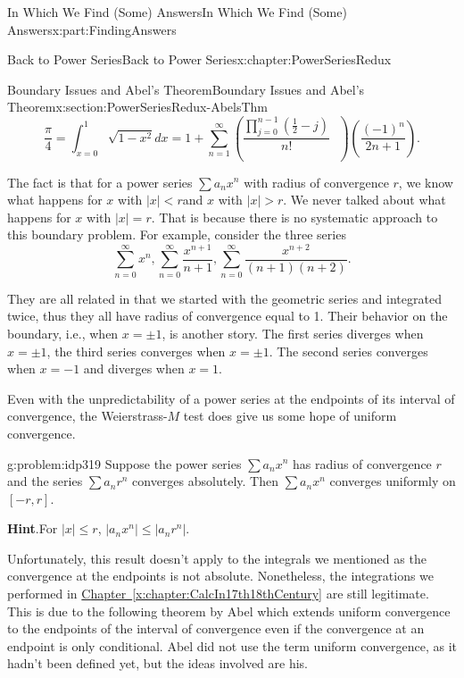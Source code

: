 \documentclass[oneside,10pt,]{book}
\newcommand{\blocktitlefont}{\relax}
\newcommand{\xreffont}{\relax}
\numberwithin{equation}{section}
\newcommand{\lt}{<}
\begin{document}
\begin{partptx}{In Which We Find (Some) Answers}{}{In Which We Find (Some) Answers}{}{}{x:part:FindingAnswers}
\begin{chapterptx}{Back to Power Series}{}{Back to Power Series}{}{}{x:chapter:PowerSeriesRedux}
\begin{sectionptx}{Boundary Issues and Abel's Theorem}{}{Boundary Issues and Abel's Theorem}{}{}{x:section:PowerSeriesRedux-AbelsThm}
\begin{equation*}
\frac{\pi}{4}=\int_{x=0}^1\sqrt{1-x^2}dx=1+\sum_{n=1}^\infty\left(\frac{\prod_{j=0}^{n-1}\left(\frac{1}{2}-j\right)}{n!}\text{ } \right)\left(\frac{\left(-1\right)^n}{2n+1}\right)\text{.}
\end{equation*}
%
\par
The fact is that for a power series \(\sum a_nx^n\) with radius of convergence \(r\), we know what happens for \(x\) with \(|x|\lt r\)and \(x\) with \(|x|>r\). We never talked about what happens for \(x\) with \(|x|=r\). That is because there is no systematic approach to this boundary problem. For example, consider the three series%
\begin{equation*}
\sum_{n=0}^\infty x^n,\sum_{n=0}^\infty\frac{x^{n+1}}{n+1}, \sum_{n=0}^\infty\frac{x^{n+2}}{(n+1)(n+2)}\text{.}
\end{equation*}
%
\par
They are all related in that we started with the geometric series and integrated twice, thus they all have radius of convergence equal to 1. Their behavior on the boundary, i.e., when \(x=\pm 1\), is another story. The first series diverges when \(x=\pm 1\), the third series converges when \(x=\pm 1\). The second series converges when \(x=-1\) and diverges when \(x=1\).%
\par
Even with the unpredictability of a power series at the endpoints of its interval of convergence, the Weierstrass-\(M\) test does give us some hope of uniform convergence.%
\begin{problem}{}{g:problem:idp319}%
Suppose the power series \(\sum a_nx^n\) has radius of convergence \(r\) and the series \(\sum a_nr^n\) converges absolutely. Then \(\sum a_nx^n\) converges uniformly on \([-r,r]\).%
\par\smallskip%
\noindent\textbf{\blocktitlefont Hint}.\hypertarget{g:hint:idp320}{}\quad{}For \(|x|\leq r\), \(|a_nx^n|\leq |a_nr^n|\).%
\end{problem}
Unfortunately, this result doesn't apply to the integrals we mentioned as the convergence at the endpoints is not absolute. Nonetheless, the integrations we performed in \hyperref[x:chapter:CalcIn17th18thCentury]{Chapter~{\xreffont\ref{x:chapter:CalcIn17th18thCentury}}} are still legitimate. This is due to the following theorem by Abel which  extends uniform convergence to the endpoints of the interval of convergence even if the convergence at an endpoint is only conditional. Abel did not use the term uniform convergence, as it hadn't been defined yet, but the ideas involved are his.%

\end{sectionptx}
\end{chapterptx}
\end{partptx}
\end{document}
